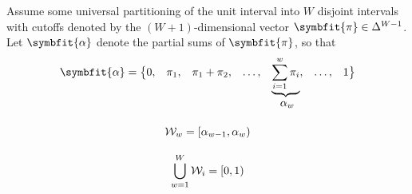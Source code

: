 \documentclass{article}
\begin{document}
\begin{comment}
Based on \textcite{Cardell_1997}, this requires that $\nu \sim \text{Gumbel}\mleft(0, 1-\sigma\mright)$ and $\varepsilon \sim C\mleft(1-\sigma, 1-\sigma\mright)$, so that $\nu + \varepsilon \sim \text{Gumbel}\mleft(0, 1\mright)$. The probability density function of $C\mleft(\lambda\mright)$ is given by
\begin{equation}
    f_{C\mleft(\lambda\mright)}\mleft(x\mright) = \frac{1}{\lambda} \sum_{n=0}^\infty \left(-1\right)^n \frac{e^{-n x}}{n!\,\Gamma\mleft(-\lambda n\mright)},\quad 0 \le \lambda \le 1,
\end{equation}
and the density function of the generalized version with scale parameter $\delta$ is obtained by a simple change of variables
\begin{equation}
    f_{C\mleft(\lambda, \delta\mright)}\mleft(x\mright) = \frac{1}{\lambda} \sum_{n=0}^\infty \left(-1\right)^n \frac{e^{-n \left(x-\delta\right)}}{n!\,\Gamma\mleft(-\lambda n\mright)},\quad 0 \le \lambda \le 1,
\end{equation}

Thus, the probability density function of $C\mleft(1-\sigma,1-\sigma\mright)$ is ``barely'' exact, and the cumulative density function is not available in closed form. Thus, it is challenging to estimate latent thresholds $\symbfit{\alpha}$ in $\varepsilon$-space. Nor it is it sufficient to directly estimate ordered probability bins $\symbfit{\pi}$. Conditional on $\symbfit{\pi}$, the likelihood is
\begin{equation}
    p\mleft(w_i \in \mathcal{W}_i \mid u_{ij}, \symbfit{\alpha}, \symbfit{\pi}\mright) = \frac{f_{C\mleft(1-\sigma, 1-\sigma\mright)}\mleft(-u_{ij}\mright)}{\symbfit\pi_i} \mathbb{1}_{\left[\alpha_{i-1}, \alpha_i\right)}\mleft(-\delta_{ij}\mright),
\end{equation}
where $\int_{\alpha_{i-1}}^{\alpha_i} \mathrm{d}F_{1-\sigma}\mleft(\varepsilon\mright) = \pi_i$


\section{Another Perspective}
\end{comment}
Assume some universal partitioning of the unit interval into $W$ disjoint intervals with cutoffs denoted by the $\left(W+1\right)$-dimensional vector $\symbfit{\pi} \in \Delta^{W-1}$. Let $\symbfit{\alpha}$ denote the partial sums of $\symbfit{\pi}$, so that
\begin{gather}
    \begin{array}{*9{c}}
       \symbfit{\alpha}  = \big\lbrace 0, & \pi_1, & \pi_1 + \pi_2, & \ldots, & \underbrace{\sum_{i=1}^{w} \pi_{i}}, & \ldots, & 1\big\rbrace \\
         & & & & \alpha_w 
    \end{array} \\
    \vphantom{\bigcup_{w=1}^W} \mathcal{W}_w = \left[\alpha_{w-1}, \alpha_w\right) \\
    \bigcup_{w=1}^W \mathcal{W}_i = \left[0, 1\right)
\end{gather}
\end{document}

